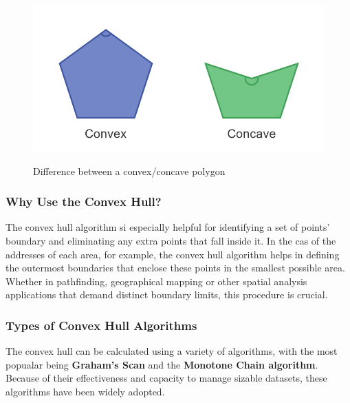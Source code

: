     \begin{figure} [H]
        \centering
        \includegraphics [width=1\textwidth] {images/andreas/areaBorders/convexConcave.png}
        \caption{Difference between a convex/concave polygon}
        \cite{Andi:concaveConvex}
    \end{figure}

    \subsubsection{Why Use the Convex Hull?}
    The convex hull algorithm si especially helpful for identifying a set of points' boundary and eliminating any extra points that fall inside it. In the cas of the addresses of each area, for example, the convex hull algorithm helps in defining the outermost boundaries that enclose these points in the smallest possible area. Whether in pathfinding, geographical mapping or other spatial analysis applications that demand distinct boundary limits, this procedure is crucial.

    \subsubsection{Types of Convex Hull Algorithms}
    The convex hull can be calculated using a variety of algorithms, with the most popualar being \textbf{Graham's Scan} and the \textbf{Monotone Chain algorithm}. Because of their effectiveness and capacity to manage sizable datasets, these algorithms have been widely adopted. \newline \newline


